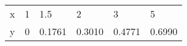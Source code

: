 \documentclass{article}
\begin{document}
\begin{table}[h!]
\begin{tabular}{|l|l|l|l|ll|}
\hline 
\multicolumn{1}{|p{30.865313pt}}{\raggedright x} & \multicolumn{1}{|p{30.865313pt}}{\raggedright 1} & \multicolumn{1}{|p{33.12375pt}}{\raggedright 1.5} & \multicolumn{1}{|p{33.876564pt}}{\raggedright 2} & \multicolumn{1}{|p{33.876564pt}}{\raggedright 3} & \multicolumn{1}{p{33.876564pt}|}{\raggedright 5}\\ 
\cline{1-5} 
\multicolumn{1}{|p{30.865313pt}}{\raggedright y} & \multicolumn{1}{|p{30.865313pt}}{\raggedright 0} & \multicolumn{1}{|p{33.12375pt}}{\raggedright 0.1761} & \multicolumn{1}{|p{33.876564pt}}{\raggedright 0.3010} & \multicolumn{1}{|p{33.876564pt}}{\raggedright 0.4771} & \multicolumn{1}{p{33.876564pt}|}{\raggedright 0.6990}\\ 
\hline 

\end{tabular}
\end{table}
\end{document}

